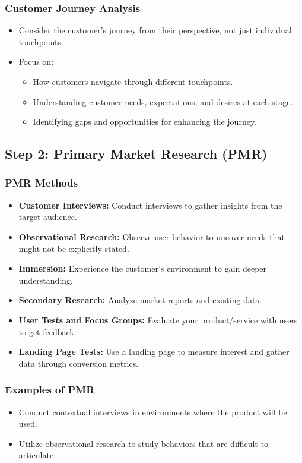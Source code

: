 \documentclass[a4paper,11pt]{article}
\begin{document}
\subsubsection{Customer Journey Analysis}
\begin{itemize}
    \item Consider the customer’s journey from their perspective, not just individual touchpoints.
    \item Focus on:
    \begin{itemize}
        \item How customers navigate through different touchpoints.
        \item Understanding customer needs, expectations, and desires at each stage.
        \item Identifying gaps and opportunities for enhancing the journey.
    \end{itemize}
\end{itemize}

\subsection{Step 2: Primary Market Research (PMR)}

\subsubsection{PMR Methods}
\begin{itemize}
    \item \textbf{Customer Interviews:} Conduct interviews to gather insights from the target audience.
    \item \textbf{Observational Research:} Observe user behavior to uncover needs that might not be explicitly stated.
    \item \textbf{Immersion:} Experience the customer's environment to gain deeper understanding.
    \item \textbf{Secondary Research:} Analyze market reports and existing data.
    \item \textbf{User Tests and Focus Groups:} Evaluate your product/service with users to get feedback.
    \item \textbf{Landing Page Tests:} Use a landing page to measure interest and gather data through conversion metrics.
\end{itemize}

\subsubsection{Examples of PMR}
\begin{itemize}
    \item Conduct contextual interviews in environments where the product will be used.
    \item Utilize observational research to study behaviors that are difficult to articulate.
\end{itemize}
\end{document}
